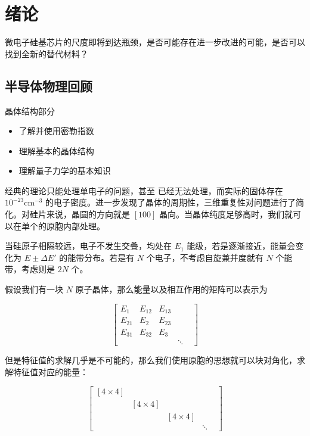\documentclass[cn,11pt,chinese,black,simple]{../elegantbook}
\begin{document}
\fi 
\def\chapname{00intro}

\chapter{绪论}

微电子硅基芯片的尺度即将到达瓶颈，是否可能存在进一步改进的可能，是否可以找到全新的替代材料？

\section{半导体物理回顾}

晶体结构部分

\begin{itemize}
    \item 了解并使用密勒指数
    \item 理解基本的晶体结构
    \item 理解量子力学的基本知识
\end{itemize}

经典的理论只能处理单电子的问题，甚至  已经无法处理，而实际的固体存在 \(10^{-23} \text{cm}^{-3}\) 的电子密度。进一步发现了晶体的周期性，三维重复性对问题进行了简化。对硅片来说，晶圆的方向就是 \([1 0 0]\) 晶向。当晶体纯度足够高时，我们就可以在单个的原胞内部处理。

当硅原子相隔较远，电子不发生交叠，均处在 \(E_1\) 能级，若是逐渐接近，能量会变化为 \(E \pm \Delta E'\) 的能带分布。若是有 \(N\) 个电子，不考虑自旋兼并度就有 \(N\) 个能带，考虑则是 \(2 N\) 个。

假设我们有一块 \(N\) 原子晶体，那么能量以及相互作用的矩阵可以表示为

\[
    \left[
        \begin{matrix}
            E_1 & E_{12} & E_{13} & & \\
            E_{21} & E_2 & E_{23} & &  \\
            E_{31} & E_{32} & E_{3} & & \\
            & & & \ddots &
        \end{matrix}    
    \right]
\]

但是特征值的求解几乎是不可能的，那么我们使用原胞的思想就可以块对角化，求解特征值对应的能量：


\[
    \left[
        \begin{matrix}
            [4 \times 4] & & & & \\
            & [4\times 4] & & & \\
            & & [4\times 4] & & \\
            & & & \ddots &
        \end{matrix}    
    \right]
\]
\end{document}
